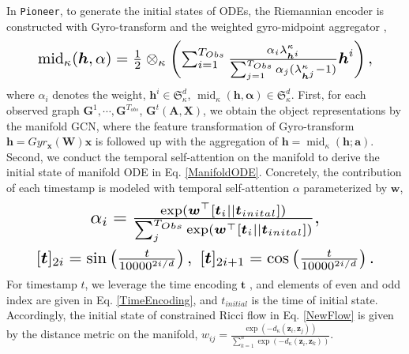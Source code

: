 In \texttt{Pioneer}, to generate the initial states of ODEs, the Riemannian encoder is constructed with Gyro-transform and the weighted gyro-midpoint aggregator \cite{Petersen16},
\begin{align}
\resizebox{0.88\hsize}{!}{$
\operatorname{mid}_\kappa({\boldsymbol h},\mathbf{\alpha})
    =\frac{1}{2}\otimes_\kappa
    \left( \sum_{i=1}^{T_{Obs}}
    \frac{\mathbf{\alpha}_i\lambda_{{\boldsymbol h}^i}^\kappa}
    {\sum_{j=1}^{T_{Obs}}\alpha_j(\lambda_{\boldsymbol{h}^j}^\kappa-1)}
    {\boldsymbol h}^i
    \right),
$}
    \label{GyroMidpoint}
\end{align}
where $\alpha_i$ denotes the weight, ${\boldsymbol h}^i \in \mathfrak{S}_\kappa^{d}$, $\operatorname{mid}_\kappa({\boldsymbol h},\mathbf{\alpha}) \in \mathfrak{S}_\kappa^{d}$.
First, for each observed graph $\boldsymbol G^1, \cdots, \boldsymbol G^{T_{obs}}$,  $\boldsymbol G^t(\boldsymbol A, \boldsymbol X)$,
we obtain the object representations by the manifold GCN, where the  feature transformation of Gyro-transform $\boldsymbol h=Gyr_{\boldsymbol x}(\boldsymbol W)\boldsymbol x$ 
is followed up with the aggregation of $\boldsymbol h=\operatorname{mid}_\kappa({\boldsymbol h}; {\boldsymbol a})$.
Second, we conduct the temporal self-attention on the manifold to derive the initial state of manifold ODE in Eq. \ref{ManifoldODE}.
Concretely, the contribution of each timestamp  is modeled with temporal self-attention $\alpha$ parameterized by $\boldsymbol w$,
\begin{align}
\resizebox{0.6\hsize}{!}{$
    \alpha_{i}=\frac{\exp(\boldsymbol w^\top[\boldsymbol t_i||\boldsymbol t_{inital}])}{\sum_j^{T_{Obs}}\exp(\boldsymbol w^\top[\boldsymbol t_i||\boldsymbol t_{inital}])},
$}
\label{AttentionFunc}
\end{align}
\begin{align}
\resizebox{0.886\hsize}{!}{$
        [\boldsymbol t]_{2i}=\sin\left(\frac{t}{10000^{2i/d}}\right),  \ [\boldsymbol t]_{2i+1}=\cos\left(\frac{t}{10000^{2i/d}}\right).
\label{TimeEncoding}
$}
\end{align}
For timestamp $t$, we leverage the time encoding  $\boldsymbol t$ , and  elements of even and odd index are given in Eq. \ref{TimeEncoding}, and $t_{initial}$ is the time of initial state.
Accordingly, the initial state of constrained Ricci flow in Eq. \ref{NewFlow} is given by the distance metric on the manifold,
$
w_{ij}=\frac{
\exp(-d_\kappa({\boldsymbol z}_i, {\boldsymbol z}_j))
}{
\sum_{k=1}^n  \exp(-d_\kappa({\boldsymbol z}_i, {\boldsymbol z}_k))
}.
$

